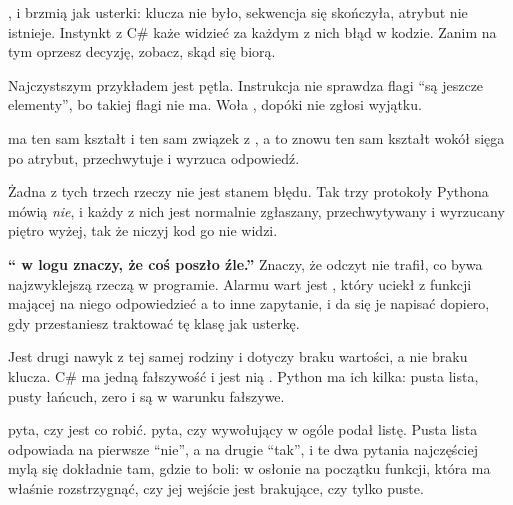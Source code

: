 ,  i  brzmią jak
usterki: klucza nie było, sekwencja się skończyła, atrybut nie istnieje.
Instynkt z C\# każe widzieć za każdym z nich błąd w kodzie. Zanim na tym
oprzesz decyzję, zobacz, skąd się biorą.

Najczystszym przykładem jest pętla. Instrukcja  nie sprawdza flagi
\enquote{są jeszcze elementy}, bo takiej flagi nie ma. Woła ,
dopóki  nie zgłosi wyjątku.


\noindent
{} ma ten sam kształt i ten sam związek z , a
 to znowu ten sam kształt wokół  \dash{}
sięga po atrybut, przechwytuje i wyrzuca odpowiedź.


\noindent
Żadna z tych trzech rzeczy nie jest stanem błędu. Tak trzy protokoły Pythona
mówią \emph{nie}, i każdy z nich jest normalnie zgłaszany, przechwytywany i
wyrzucany piętro wyżej, tak że niczyj kod go nie widzi.

\begin{trapbox}
\textbf{\enquote{ w logu znaczy, że coś poszło źle.}}
Znaczy, że odczyt nie trafił, co bywa najzwyklejszą rzeczą w programie.
Alarmu wart jest , który uciekł z funkcji mającej na niego
odpowiedzieć \dash{} a to inne zapytanie, i da się je napisać dopiero, gdy
przestaniesz traktować tę klasę jak usterkę.
\end{trapbox}

\noindent
Jest drugi nawyk z tej samej rodziny i dotyczy braku wartości, a nie braku
klucza. C\# ma jedną fałszywość i jest nią . Python ma ich kilka:
pusta lista, pusty łańcuch, zero i  są w warunku fałszywe.


\noindent
{} pyta, czy jest co robić.  pyta, czy
wywołujący w ogóle podał listę. Pusta lista odpowiada na pierwsze
\enquote{nie}, a na drugie \enquote{tak}, i te dwa pytania najczęściej mylą
się dokładnie tam, gdzie to boli: w osłonie na początku funkcji, która ma
właśnie rozstrzygnąć, czy jej wejście jest brakujące, czy tylko puste.

